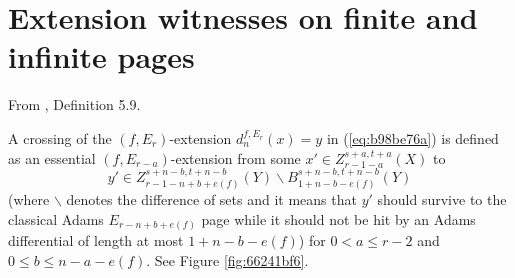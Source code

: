 \section{Extension witnesses on finite and infinite pages}



\begin{definition}
\label{paper:5.9}
From \cite{LWX126}, Definition 5.9.\par
\label{def:41d51149}
    A crossing of the $(f,E_r)$-extension $d_{n}^{f,E_r}(x)=y$ in (\ref{eq:b98be76a}) is defined as an essential $(f, E_{r-a})$-extension from some $x'\in Z_{r-1-a}^{s+a,t+a}(X)$ to 
    $$y'\in Z_{r-1-n+b+e(f)}^{s+n-b,t+n-b}(Y)\backslash B_{1+n-b-e(f)}^{s+n-b,t+n-b}(Y)$$
    (where $\backslash$ denotes the difference of sets and it means that $y'$ should survive to the classical Adams $E_{r-n+b+e(f)}$ page while it should not be hit by an Adams differential of length at most $1+n-b-e(f)$) for $0<a \le r-2$ and $0\le b\le n-a-e(f)$. See Figure \ref{fig:66241bf6}.




\end{definition}

